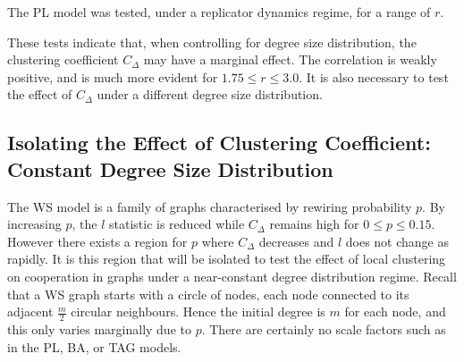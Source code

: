The PL model was tested, under a replicator dynamics regime, for a range of $r$. 
\FloatBarrier
{}
\FloatBarrier
{} \FloatBarrier

These tests indicate that, when controlling for degree size distribution, the clustering coefficient $C_\Delta$ may have a marginal effect. The correlation is weakly positive, and is much more evident for $1.75\leq r\leq 3.0$. It is also necessary to test the effect of $C_\Delta$ under a different degree size distribution. \\

\subsection{Isolating the Effect of Clustering Coefficient: Constant Degree Size Distribution}
The WS model is a family of graphs characterised by rewiring probability $p$. By increasing $p$, the $l$ statistic is reduced while $C_\Delta$ remains high for $0\leq p\leq0.15$. However there exists a region for $p$ where $C_\Delta$ decreases and $l$ does not change as rapidly. It is this region that will be isolated to test the effect of local clustering on cooperation in graphs under a near-constant degree distribution regime. Recall that a WS graph starts with a circle of nodes, each node connected to its adjacent $\frac{m}{2}$ circular neighbours. Hence the initial degree is $m$ for each node, and this only varies marginally due to $p$. There are certainly no scale factors such as in the PL, BA, or TAG models. \\

